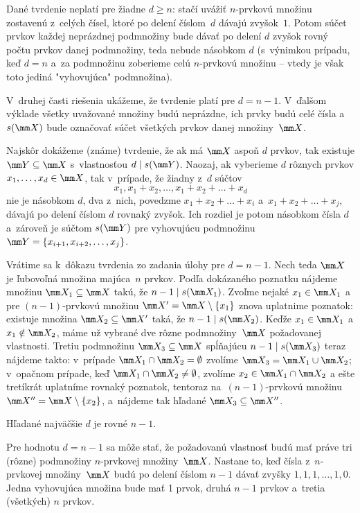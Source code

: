 {%
\def\podmn{\subseteq}
Dané tvrdenie neplatí pre žiadne $d\ge n$: stačí uvážiť
$n$-prvkovú množinu zostavenú z~celých čísel, ktoré po delení
číslom~$d$ dávajú zvyšok~$1$. Potom súčet prvkov každej neprázdnej podmnožiny bude dávať po delení $d$ zvyšok rovný počtu prvkov danej podmnožiny, teda nebude násobkom $d$ (s~výnimkou prípadu, keď $d=n$ a~za podmnožinu zoberieme celú $n$-prvkovú množinu -- vtedy je však toto jediná "vyhovujúca" podmnožina).

V~druhej časti riešenia ukážeme, že tvrdenie platí pre $d=n-1$. V~ďalšom výklade všetky uvažované množiny budú neprázdne, ich prvky budú
celé čísla a~$s(\mm X)$ bude označovať súčet všetkých prvkov danej množiny~$\mm X$.

Najskôr dokážeme (známe) tvrdenie, že ak má $\mm X$ aspoň $d$ prvkov,
tak existuje $\mm Y\podmn\mm X$ s~vlastnosťou $d\mid s(\mm Y)$. Naozaj,
ak vyberieme $d$ rôznych prvkov $x_1,\dots,x_d\in\mm X$, tak
v~prípade, že žiadny z~$d$ súčtov
$$
x_1,x_1+x_2,\dots,x_1+x_2+\dots+x_d
$$
nie je násobkom $d$, dva z~nich, povedzme $x_1+x_2+\dots+x_i$ a~$x_1+x_2+\dots+x_j$, dávajú po delení číslom $d$ rovnaký
zvyšok. Ich rozdiel je potom násobkom čísla $d$ a~zároveň je súčtom
$s(\mm Y)$ pre vyhovujúcu podmnožinu $\mm Y=\{x_{i+1},x_{i+2},\dots,x_j\}$.

Vrátime sa k~dôkazu tvrdenia zo zadania úlohy pre $d=n-1$.
Nech teda $\mm X$ je ľubovoľná množina majúca~$n$ prvkov.
Podľa dokázaného poznatku
nájdeme množinu $\mm X_1\podmn\mm X$ takú, že $n-1\mid s(\mm X_1)$. Zvoľme
nejaké $x_1\in\mm X_1$ a pre $(n-1)$-prvkovú množinu $\mm X'=\mm X\setminus\{x_1\}$ znova
uplatnime poznatok: existuje množina $\mm X_2\podmn\mm  X'$ taká, že
${n-1}\mid s(\mm X_2)$. Keďže $x_1\in\mm X_1$ a $x_1\notin\mm X_2$, máme už
vybrané dve rôzne podmnožiny~$\mm X$
požadovanej vlastnosti. Tretiu podmnožinu
$\mm X_3\podmn\mm X$ spĺňajúcu $n-1\mid s(\mm X_3)$ teraz nájdeme takto:
v~prípade $\mm X_1\cap\mm  X_2=\emptyset$ zvolíme $\mm X_3=\mm X_1\cup\mm  X_2$;
v~opačnom prípade, keď $\mm X_1\cap\mm X_2\ne\emptyset$, zvolíme
$x_2\in\mm X_1\cap\mm X_2$ a ešte tretíkrát uplatníme rovnaký poznatok,
tentoraz na~$(n-1)$-prvkovú množinu $\mm X''=\mm X\setminus\{x_2\}$, a~nájdeme tak hľadané $\mm X_3\podmn\mm X''$.

\odpoved
Hľadané najväčšie $d$ je rovné $n-1$.

\poznamka
Pre hodnotu $d=n-1$ sa môže stať, že požadovanú
vlastnosť budú mať práve tri (rôzne) podmnožiny $n$-prvkovej
množiny~$\mm X$. Nastane to, keď čísla z~$n$-prvkovej množiny~$\mm X$
budú po delení číslom $n-1$ dávať zvyšky $1,1,1,\dots,1,0$.
Jedna vyhovujúca množina bude mať 1 prvok, druhá $n-1$ prvkov
a~tretia (všetkých) $n$ prvkov.}

